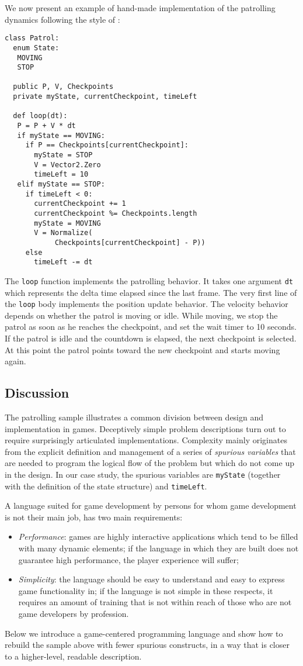 We now present an example of hand-made implementation of the patrolling dynamics following the style of \cite{millington2009artificial}:
\begin{lstlisting}
class Patrol:
  enum State:
   MOVING
   STOP

  public P, V, Checkpoints
  private myState, currentCheckpoint, timeLeft

  def loop(dt):
   P = P + V * dt
   if myState == MOVING:
     if P == Checkpoints[currentCheckpoint]:
       myState = STOP
       V = Vector2.Zero
       timeLeft = 10
   elif myState == STOP:
     if timeLeft < 0:
       currentCheckpoint += 1
       currentCheckpoint %= Checkpoints.length
       myState = MOVING
       V = Normalize(
            Checkpoints[currentCheckpoint] - P))
     else
       timeLeft -= dt
\end{lstlisting}
The \texttt{loop} function implements the patrolling behavior. It takes one argument \texttt{dt} which represents the delta time elapsed since the last frame. The very first line of the \texttt{loop} body implements the position update behavior. The velocity behavior depends on whether the patrol is moving or idle. While moving, we stop the patrol as soon as he reaches the checkpoint, and set the wait timer to 10 seconds. If the patrol is idle and the countdown is elapsed, the next checkpoint is selected. At this point the patrol points toward the new checkpoint and starts moving again.



\subsection{Discussion}
The patrolling sample illustrates a common division between design and implementation in games. Deceptively simple problem descriptions turn out to require surprisingly articulated implementations. Complexity mainly originates from the explicit definition and management of a series of \textit{spurious variables} that are needed to program the logical flow of the problem but which do not come up in the design. In our case study, the spurious variables are \texttt{myState} (together with the definition of the state structure) and \texttt{timeLeft}.

A language suited for game development by persons for whom game development is not their main job, has two main requirements:
\begin{itemize}
\item \textit{Performance}: games are highly interactive applications which tend to be filled with many dynamic elements; if the language in which they are built does not guarantee high performance, the player experience will suffer;
\item \textit{Simplicity}: the language should be easy to understand and easy to express game functionality in; if the language is not simple in these respects, it requires an amount of training that is not within reach of those who are not game developers by profession.
\end{itemize}

Below we introduce a game-centered programming language and show how to rebuild the sample above with fewer spurious constructs, in a way that is closer to a higher-level, readable description. 